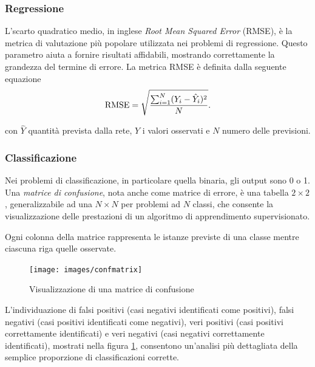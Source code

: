 \subsubsection{Regressione}
\label{subsubsec:regressione}

L'{scarto quadratico medio}, in inglese \emph{Root Mean Squared Error} (RMSE), è la metrica di valutazione più popolare utilizzata nei problemi di regressione. Questo parametro aiuta a fornire risultati affidabili, mostrando correttamente la grandezza del termine di errore.
La metrica RMSE è definita dalla seguente equazione
\begin{equation}
	\operatorname{RMSE} = \sqrt{\frac{\sum_{i=1}^{N}({Y}_i - \hat{Y}_i)^2}{N}} \mbox{.}
	\label{eq:rmse}
\end{equation}

con $\hat{Y}$ quantità prevista dalla rete, $Y$ i valori osservati e $N$ numero delle previsioni.
\subsubsection{Classificazione}
\label{subsubsec:classificazione}

Nei problemi di classificazione, in particolare quella binaria, gli output sono 0 o 1. \\
Una \emph{matrice di confusione}, nota anche come matrice di errore, è una tabella $2 \times 2$, generalizzabile ad una $N \times N$ per problemi ad $N$ classi, che consente la visualizzazione delle prestazioni di un algoritmo di apprendimento supervisionato. 

Ogni colonna della matrice rappresenta le istanze previste di una classe mentre ciascuna riga quelle osservate. 

\begin{figure}[t]
	\centering
	{\texttt{[image: images/confmatrix]}}
	\caption{Visualizzazione di una matrice di confusione}
	\label{fig:confmat}
\end{figure}

L'individuazione di falsi positivi (casi negativi identificati come positivi), falsi negativi (casi positivi identificati come negativi), veri positivi (casi positivi correttamente identificati) e veri negativi (casi negativi correttamente identificati), mostrati nella figura \ref{fig:confmat}, consentono  un'analisi più dettagliata della semplice proporzione di classificazioni corrette.

